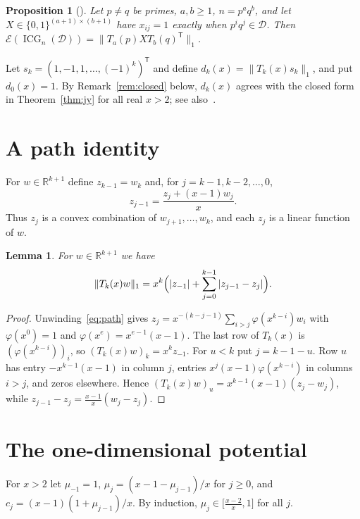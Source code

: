 \documentclass[11pt]{article}
\newtheorem{lemma}[theorem]{Lemma}
\newtheorem{proposition}[theorem]{Proposition}
\theoremstyle{remark}
\newcommand{\ICG}{\operatorname{ICG}}
\newcommand{\E}{\mathcal E}
\begin{document}
\begin{proposition}[{\cite[Proposition~2.2]{jy}}]\label{prop:model}
Let $p\ne q$ be primes, $a,b\ge1$, $n=p^aq^b$, and let $X\in\{0,1\}^{(a+1)
\times(b+1)}$ have $x_{ij}=1$ exactly when $p^iq^j\in\mathcal D$. Then
$\E(\ICG_n(\mathcal D))=\|T_a(p)XT_b(q)^{\mathsf T}\|_1$.
\end{proposition}

Let $s_k=(1,-1,1,\dots,(-1)^k)^{\mathsf T}$ and define
$d_k(x)=\|T_k(x)s_k\|_1$, and put $d_0(x)=1$. By Remark~\ref{rem:closed}
below, $d_k(x)$ agrees with the closed form in Theorem~\ref{thm:jy} for all
real $x>2$; see also~\cite[(3.6)]{jy}.

\section{A path identity}\label{sec:path}
For $w\in\mathbb R^{k+1}$ define $z_{k-1}=w_k$ and, for
$j=k-1,k-2,\dots,0$,
\begin{equation}\label{eq:path}
z_{j-1}=\frac{z_j+(x-1)w_j}{x}.
\end{equation}
Thus $z_j$ is a convex combination of $w_{j+1},\dots,w_k$, and each $z_j$ is a
linear function of $w$.

\begin{lemma}\label{lem:path}
For $w\in\mathbb R^{k+1}$ we have
\[
\|T_k(x)w\|_1=x^k\Bigl(|z_{-1}|+\sum_{j=0}^{k-1}|z_{j-1}-z_j|\Bigr).
\]
\end{lemma}
\begin{proof}
Unwinding~\eqref{eq:path} gives
$z_j=x^{-(k-j-1)}\sum_{i>j}\varphi(x^{k-i})w_i$ with $\varphi(x^0)=1$ and
$\varphi(x^e)=x^{e-1}(x-1)$. The last row of $T_k(x)$ is
$(\varphi(x^{k-i}))_i$, so $(T_k(x)w)_k=x^kz_{-1}$. For $u<k$ put
$j=k-1-u$. Row $u$ has entry $-x^{k-1}(x-1)$ in column $j$, entries
$x^{j}(x-1)\varphi(x^{k-i})$ in columns $i>j$, and zeros elsewhere. Hence
$(T_k(x)w)_u=x^{k-1}(x-1)(z_j-w_j)$, while
$z_{j-1}-z_j=\frac{x-1}{x}(w_j-z_j)$.
\end{proof}

\section{The one-dimensional potential}\label{sec:potential}
For $x>2$ let $\mu_{-1}=1$, $\mu_j=(x-1-\mu_{j-1})/x$ for $j\ge0$, and
$c_j=(x-1)(1+\mu_{j-1})/x$. By induction,
$\mu_j\in\bigl[\frac{x-2}{x},1\bigr]$ for all $j$.
\end{document}
